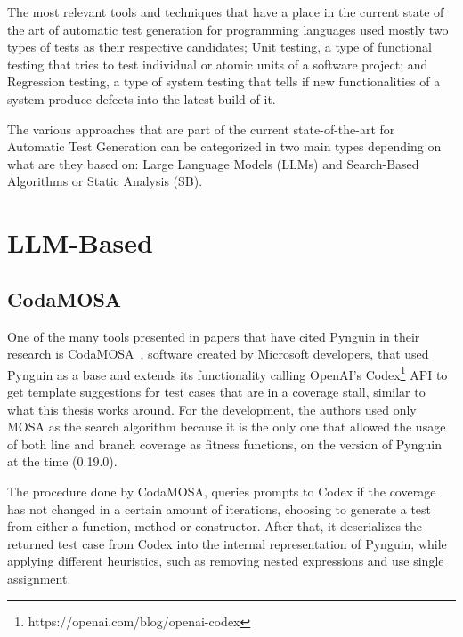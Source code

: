 \documentclass[%
  chapterprefix=false,%
  open=right,%
  twoside=true,%
  paper=a4,%
  logofile={Figures/logo.png},%
  thesistype=master,%
  UKenglish,%
]{se2thesis}
\begin{document}
The most relevant tools and techniques that have a place in the current state of the art of automatic test generation for programming languages used mostly two types of tests as their respective candidates; Unit testing, a type of functional testing that tries to test individual or atomic units of a software project; and Regression testing, a type of system testing that tells if new functionalities of a system produce defects into the latest build of it.


The various approaches that are part of the current state-of-the-art for Automatic Test Generation can be categorized in two main types depending on what are they based on: Large Language Models (LLMs) and Search-Based Algorithms or Static Analysis (SB).

\section{LLM-Based}

\subsection*{CodaMOSA}

One of the many tools presented in papers that have cited Pynguin in their research is CodaMOSA~\cite{DBLP:conf/icse/LemieuxILS23}, software created by Microsoft developers, that used Pynguin as a base and extends its functionality calling OpenAI's Codex\footnote{https://openai.com/blog/openai-codex} API to get template suggestions for test cases that are in a coverage stall, similar to what this thesis works around.
For the development, the authors used only MOSA as the search algorithm because it is the only one that allowed the usage of both line and branch coverage as fitness functions, on the version of Pynguin at the time (0.19.0).

The procedure done by CodaMOSA, queries prompts to Codex if the coverage has not changed in a certain amount of iterations, choosing to generate a test from either a function, method or constructor.
After that, it deserializes the returned test case from Codex into the internal representation of Pynguin, while applying different heuristics, such as removing nested expressions and use single assignment.
\end{document}
